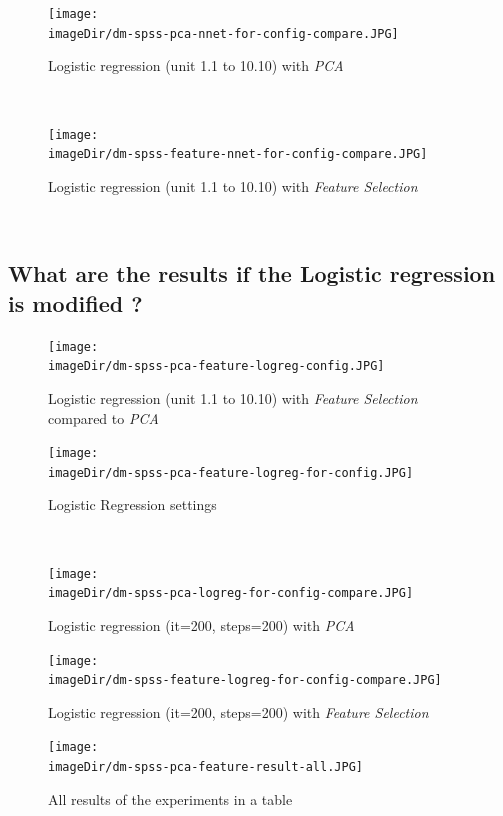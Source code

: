 \documentclass[11pt, a4paper, twoside]{article}   	%
\newcommand{\imageDir}{./images/}
\begin{document}
\begin{figure}[h]
\centering
\texttt{[image: \\imageDir/dm-spss-pca-nnet-for-config-compare.JPG]}
\caption{Logistic regression (unit 1.1 to 10.10) with \emph{PCA}}
\end{figure}
\ \newpage

\begin{figure}[h]
\centering
\texttt{[image: \\imageDir/dm-spss-feature-nnet-for-config-compare.JPG]}
\caption{Logistic regression (unit 1.1 to 10.10) with \emph{Feature Selection}}
\end{figure}
\ \newpage

\subsection{What are the results if the Logistic regression is modified ?}
\begin{figure}[h]
\centering
\texttt{[image: \\imageDir/dm-spss-pca-feature-logreg-config.JPG]}
\caption{Logistic regression (unit 1.1 to 10.10) with \emph{Feature Selection} compared to \emph{PCA}}
\end{figure}

\begin{figure}[h]
\centering
\texttt{[image: \\imageDir/dm-spss-pca-feature-logreg-for-config.JPG]}
\caption{Logistic Regression settings}
\end{figure}
\ \newpage

\begin{figure}[h]
\centering
\texttt{[image: \\imageDir/dm-spss-pca-logreg-for-config-compare.JPG]}
\caption{Logistic regression (it=200, steps=200) with \emph{PCA}}
\end{figure}


\begin{figure}[h]
\centering
\texttt{[image: \\imageDir/dm-spss-feature-logreg-for-config-compare.JPG]}
\caption{Logistic regression (it=200, steps=200) with \emph{Feature Selection}}
\end{figure}

\begin{figure}
\centering
\texttt{[image: \\imageDir/dm-spss-pca-feature-result-all.JPG]}
\caption{All results of the experiments in a table}
\end{figure}
\end{document}
